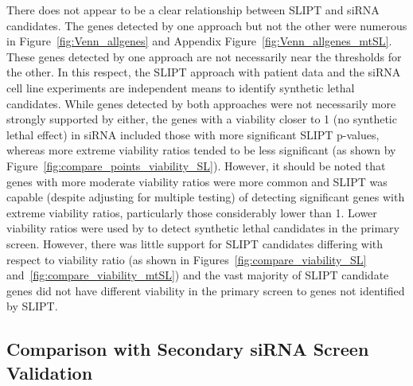 There does not appear to be a clear relationship between \gls{SLIPT} and \gls{siRNA} candidates. The genes detected by one approach but not the other were numerous in Figure~\ref{fig:Venn_allgenes} and Appendix Figure~\ref{fig:Venn_allgenes_mtSL}. These genes detected by one approach are not necessarily near the thresholds for the other. In this respect, the \gls{SLIPT} approach with patient data and the \gls{siRNA} cell line experiments are independent means to identify \gls{synthetic lethal} candidates. While genes detected by both approaches were not necessarily more strongly supported by either, the genes with a viability closer to 1 (no \gls{synthetic lethal} effect) in \gls{siRNA} included those with more significant \gls{SLIPT} p-values, whereas more extreme viability ratios tended to be less significant (as shown by Figure~\ref{fig:compare_points_viability_SL}). However, it should be noted that genes with more moderate viability ratios were more common and \gls{SLIPT} was capable (despite adjusting for multiple testing) of detecting significant genes with extreme viability ratios, particularly those considerably lower than 1. 
%
Lower viability ratios were used by \citet{Telford2015} to detect \gls{synthetic lethal} candidates in the primary screen. However, there was little support for \gls{SLIPT} candidates differing with respect to viability ratio (as shown in Figures~\ref{fig:compare_viability_SL} and~\ref{fig:compare_viability_mtSL}) %
and the vast majority of \gls{SLIPT} candidate genes did not have different viability in the primary screen to genes not identified by \gls{SLIPT}.


\FloatBarrier

\subsection{Comparison with Secondary siRNA Screen Validation} 
\label{chapt3:secondary_screen}

